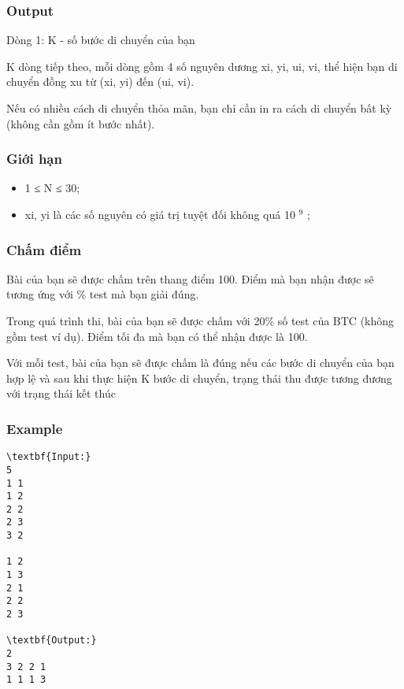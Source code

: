 \subsubsection{   Output  }

   Dòng 1: K - số bước di chuyển của bạn  

   K dòng tiếp theo, mỗi dòng gồm 4 số nguyên dương xi, yi, ui, vi, thể hiện bạn di chuyển đồng xu từ (xi, yi) đến (ui, vi).  

   Nếu có nhiều cách di chuyển thỏa mãn, bạn chỉ cần in ra cách di chuyển bất kỳ (không cần gồm ít bước nhất).  

\subsubsection{   Giới hạn  }
\begin{itemize}
	\item     1 ≤ N ≤ 30;   
	\item     xi, yi là các số nguyên có giá trị tuyệt đối không quá 10    $^     9    $    ;   
\end{itemize}

\subsubsection{   Chấm điểm  }

   Bài của bạn sẽ được chấm trên thang điểm 100. Điểm mà bạn nhận được sẽ tương ứng với \% test mà bạn giải đúng.  

   Trong quá trình thi, bài của bạn sẽ được chấm với 20\% số test của BTC (không gồm test ví dụ). Điểm tối đa mà bạn có thể nhận được là 100.  

   Với mỗi test, bài của bạn sẽ được chấm là đúng nếu các bước di chuyển của bạn hợp lệ và sau khi thực hiện K bước di chuyển, trạng thái thu được tương đương với trạng thái kết thúc  

\subsubsection{   Example  }
\begin{verbatim}
\textbf{Input:}
5
1 1
1 2
2 2
2 3
3 2

1 2
1 3
2 1
2 2
2 3

\textbf{Output:}
2
3 2 2 1
1 1 1 3
\end{verbatim}